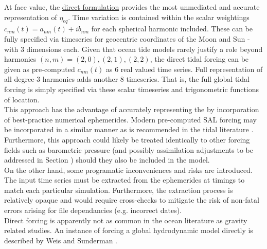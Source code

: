 At face value, the \underline{direct formulation} provides the most unmediated and accurate representation of $\eta_{eq}$. Time variation is contained within the scalar weightings $c_{nm}(t)=a_{nm}(t) + ib_{nm}$ for each spherical harmonic included.   These can be fully specified via timeseries for geocentric coordinates of the Moon and Sun - with 3 dimensions each. Given that ocean tide models rarely justify a role beyond harmonics $(n,m) = (2,0) , (2,1) , (2,2)$, the direct tidal forcing can be given as pre-computed $c_{nm}(t)$ as 6 real valued time series.  Full representation of all degree-3 harmonics adds another 8 timeseries.
That is, the full global tidal forcing is simply specified via these scalar timeseries and trigonometric functions of location.\\
This approach has the advantage of accurately representing the \ATGP{} by incorporation of best-practice numerical ephemerides. Modern pre-computed SAL forcing may be incorporated in a similar manner as is recommended in the tidal literature \citep{Egbert:2002ug}.  
Furthermore, this approach could likely be treated identically to other forcing fields such as barometric pressure (and possibly assimilation adjustments to be addressed in Section \label{S:plan_bodyforcing}) should they also be included in the model.\\

On the other hand, some programatic inconveniences and risks are introduced. The input time series must be extracted from the ephemerides at timings to match each particular simulation.  Furthermore, the extraction process is relatively opaque and would require cross-checks to mitigate the risk of non-fatal errors arising for file dependancies (e.g. incorrect dates).\\
Direct forcing is apparently not as common in the ocean literature as gravity related studies.   An instance of forcing a global hydrodynamic model directly is described by Weis and Sunderman \citep{Weis:2008ex}.\\\




